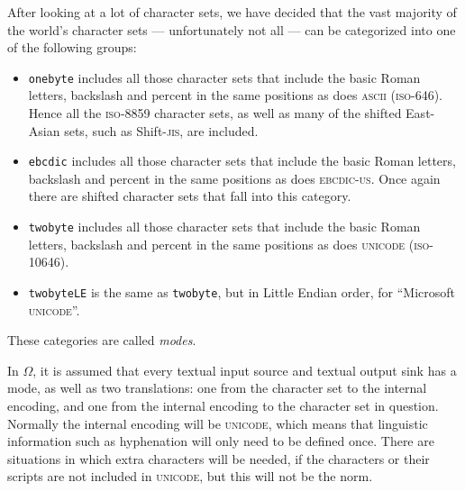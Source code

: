 \documentclass[fleqn]{article}
\newcommand{\OMEGA}{$\Omega$}
\begin{document}
After looking at a lot of character sets, we have decided that the
vast majority of the world's character sets --- unfortunately not
all --- can be categorized into one of the following groups:
\begin{itemize}
\item \texttt{onebyte} includes all those character sets that include
the basic Roman letters, backslash and percent in the same positions
as does \textsc{ascii} (\textsc{iso-646}).  Hence all the \textsc{iso-8859}
character sets, as well as many of the shifted East-Asian sets,
such as Shift-\textsc{jis}, are included.
\item \texttt{ebcdic} includes all those character sets that include
the basic Roman letters, backslash and percent in the same positions
as does \textsc{ebcdic-us}.  Once again there are shifted character
sets that fall into this category.
\item \texttt{twobyte} includes all those character sets that include
the basic Roman letters, backslash and percent in the same positions
as does \textsc{unicode} (\textsc{iso-10646}).
\item \texttt{twobyteLE} is the same as \texttt{twobyte}, but in Little
Endian order, for ``Microsoft \textsc{unicode}''.
\end{itemize}
These categories are called \emph{modes}.

In \OMEGA, it is assumed that every textual input source and textual output
sink has a mode, as well as two translations: one from the character set to
the internal encoding, and one from the internal encoding to the character
set in question.  Normally the internal encoding will be \textsc{unicode},
which means that linguistic information such as hyphenation will only need
to be defined once.  There are situations in which extra characters will
be needed, if the characters or their scripts are not included in
\textsc{unicode}, but this will not be the norm.
\end{document}

